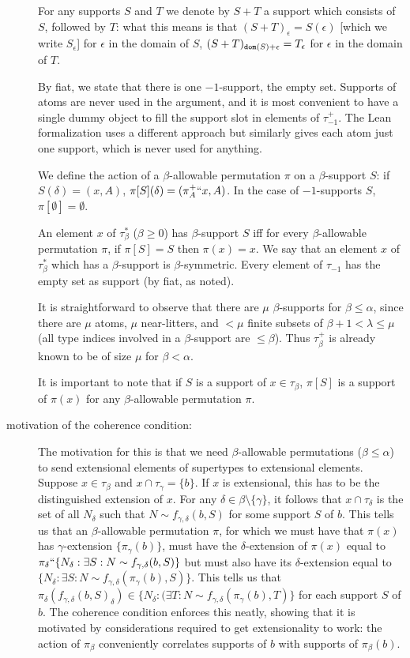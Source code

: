 \documentclass[112pt]{article}
\begin{document}
\begin{description}
For any supports $S$ and $T$ we denote by $S+T$ a support which consists
of $S$, followed by $T$:  what this means is that $(S+T)_\epsilon = S(\epsilon)$ [which we write $S_\epsilon$] for $\epsilon$ in the domain of $S$, $(S+T)_{{\tt dom}(S)+\epsilon} = T_\epsilon$ for $\epsilon$ in the domain of $T$.

By fiat, we state that there is one $-1$-support, the empty set.   Supports of atoms are never used in the argument, and it is most convenient to have a single dummy object to fill the support slot in elements of
$\tau_{-1}^+$.  The Lean formalization uses a different approach but similarly gives each atom just one support, which is never used for anything.

We define the action of a $\beta$-allowable permutation $\pi$ on a $\beta$-support $S$:  if $S(\delta) = (x,A)$, $\pi[S](\delta) = (\pi^+_A``x,A)$.  In the case of $-1$-supports $S$, $\pi[\emptyset]=\emptyset$.   

An element $x$ of $\tau^*_\beta$ ($\beta \geq 0$) has $\beta$-support $S$ iff for every $\beta$-allowable permutation $\pi$, if $\pi[S] = S$ then $\pi(x)=x$.  We say that  an element $x$ of $\tau^*_\beta$ which has a $\beta$-support is $\beta$-symmetric. Every element of $\tau_{-1}$ has the empty set as support (by fiat, as noted).

It is straightforward to observe that there are $\mu$ $\beta$-supports for $\beta\leq \alpha$, since there are $\mu$ atoms, $\mu$ near-litters, and
$<\mu$ finite subsets of $\beta +1<\lambda \leq \mu$ (all type indices involved in a $\beta$-support are $\leq \beta$).  Thus $\tau_\beta^+$ is already known to be of size $\mu$ for $\beta<\alpha$.

It is important to note that if $S$ is a support of $x\in \tau_\beta$, $\pi[S]$ is a support of $\pi(x)$ for any $\beta$-allowable permutation $\pi$.

\item[motivation of the coherence condition:]  The motivation for this is that we need $\beta$-allowable permutations ($\beta \leq\alpha$) to send extensional elements of supertypes to extensional elements.  Suppose $x \in \tau_\beta$ and 
$x \cap \tau_\gamma = \{b\}$.  If $x$ is extensional, this has to be the distinguished extension of $x$.  For any $\delta \in \beta \setminus \{\gamma\}$,
it follows that $x \cap \tau_\delta$ is the set of all $N_\delta$ such that $N \sim f_{\gamma,\delta}(b,S)$ for some support $S$ of $b$.  This tells us that an $\beta$-allowable permutation $\pi$, for which we must have that $\pi(x)$ has $\gamma$-extension $\{\pi_\gamma(b)\}$, must have the  $\delta$-extension of $\pi(x)$ equal to $\pi_\delta``\{N_\delta:\exists S:N \sim f_{\gamma,\delta}(b,S)\}$
but must also have its $\delta$-extension equal to $\{N_\delta:\exists S:N \sim f_{\gamma,\delta}(\pi_\gamma(b),S)\}$.  This tells us that $\pi_\delta(f_{\gamma,\delta}(b,S)_\delta) \in \{N_\delta:(\exists T:N \sim f_{\gamma,\delta}(\pi_\gamma(b),T)\}$ for each support $S$ of $b$.  The coherence condition enforces this neatly, showing that it is motivated by considerations required to get extensionality to work: the action of $\pi_\beta$ conveniently correlates supports of $b$ with supports of $\pi_\beta(b)$.


\end{description}
\end{document}
